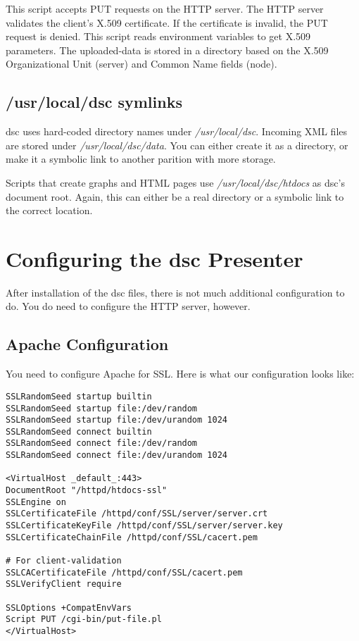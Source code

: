 \documentclass{report}
\def\dsc{{\sc dsc}}
\begin{document}
This script accepts PUT requests on the HTTP server.  The HTTP
server validates the client's X.509 certificate.  If the certificate
is invalid, the PUT request is denied.  This script reads environment
variables to get X.509 parameters.  The uploaded-data is stored in
a directory based on the X.509 Organizational Unit (server) and
Common Name fields (node).

\section{/usr/local/dsc symlinks}

{\dsc} uses hard-coded directory names under {\em /usr/local/dsc\/}.
Incoming XML files are stored under {\em /usr/local/dsc/data\/}.
You can either create it as a directory, or make it a symbolic link
to another parition with more storage.

Scripts that create graphs and HTML pages use {\em /usr/local/dsc/htdocs\/}
as {\dsc}'s document root.  Again, this can either be a real directory
or a symbolic link to the correct location.

\chapter{Configuring the {\dsc} Presenter}

After installation of the {\dsc} files, there is not much additional
configuration to do.  You do need to configure the HTTP server, however.

\section{Apache Configuration}

\noindent
You need to configure Apache for SSL.  Here is what our configuration
looks like:

\begin{verbatim}
SSLRandomSeed startup builtin
SSLRandomSeed startup file:/dev/random
SSLRandomSeed startup file:/dev/urandom 1024
SSLRandomSeed connect builtin
SSLRandomSeed connect file:/dev/random
SSLRandomSeed connect file:/dev/urandom 1024

<VirtualHost _default_:443>
DocumentRoot "/httpd/htdocs-ssl"
SSLEngine on
SSLCertificateFile /httpd/conf/SSL/server/server.crt
SSLCertificateKeyFile /httpd/conf/SSL/server/server.key
SSLCertificateChainFile /httpd/conf/SSL/cacert.pem

# For client-validation
SSLCACertificateFile /httpd/conf/SSL/cacert.pem
SSLVerifyClient require

SSLOptions +CompatEnvVars
Script PUT /cgi-bin/put-file.pl
</VirtualHost>
\end{verbatim}
\end{document}
